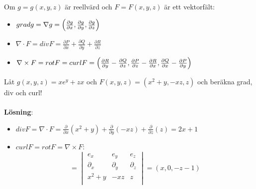 \documentclass{report}
\begin{document}
{
Om $ g = g(x,y,z) $ är reellvärd och $ F = F(x,y,z) $ är ett vektorfält:
\begin{itemize}
	\item $ grad g = \nabla g = \Bigl( \frac{\partial g }{\partial x } , \frac{\partial g }{\partial y } , \frac{\partial g }{\partial z }  \Bigr)  $
	\item $ \nabla \cdot F = div F = \frac{\partial P }{\partial x } + \frac{\partial Q }{\partial y } + \frac{\partial R }{\partial z }    $
	\item $ \nabla \times F = rot F = curl F = \Bigl( \frac{\partial R }{\partial y } - \frac{\partial Q }{\partial z } , \frac{\partial P }{\partial z } - \frac{\partial R }{\partial x } , \frac{\partial Q }{\partial x } - \frac{\partial P }{\partial y }  \Bigr)  $ 
\end{itemize}
}

\ex{}
{
Låt $ g(x,y,z) = xe^y+ zx $ och $ F(x,y,z) = (x^2+y, -xz, z) $ och beräkna grad, div och curl!\\\\

\textbf{Lösning}:\\
\begin{itemize}
	\item $ div F = \nabla \cdot F = \frac{\partial  }{\partial x } (x^2+y) + \frac{\partial  }{\partial y } (-xz) + \frac{\partial  }{\partial z } (z) = 2x+1$
	\item $ curl F = rot F = \nabla \times F $:
	\begin{equation*}
	=
	\begin{vmatrix}
		e_x & e_y & e_z \\
		\partial_x & \partial_y & \partial_z \\
		x^2+y & -xz & z \\
	\end{vmatrix}
	= (x,0,-z-1)
	\end{equation*}
\end{itemize}
}
\end{document}
